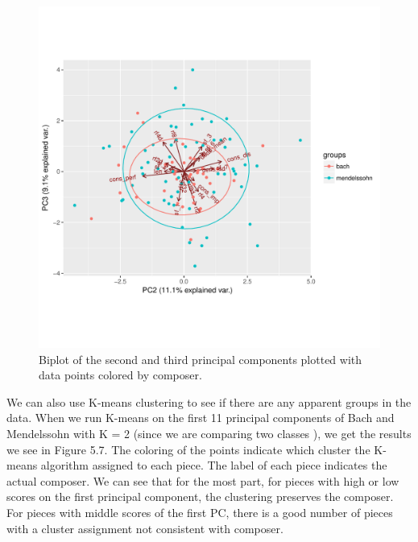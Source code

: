 \documentclass[12pt,twoside]{reedthesis}
\theoremstyle{definition}
\theoremstyle{definition}
\theoremstyle{definition}
\theoremstyle{remark}
\begin{document}
\begin{figure}[H]
\centering
\includegraphics[scale = .7]{images/bi_elipse23.pdf}
\caption{Biplot of the second and third principal components plotted with data points colored by composer.}
\label{subd}
\end{figure}
We can also use K-means clustering to see if there are any apparent
groups in the data. When we run K-means on the first 11 principal
components of Bach and Mendelssohn with K = 2 (since we are comparing
two classes ), we get the results we see in Figure 5.7. The coloring of
the points indicate which cluster the K-means algorithm assigned to each
piece. The label of each piece indicates the actual composer. We can see
that for the most part, for pieces with high or low scores on the first
principal component, the clustering preserves the composer. For pieces
with middle scores of the first PC, there is a good number of pieces
with a cluster assignment not consistent with composer.
\end{document}
